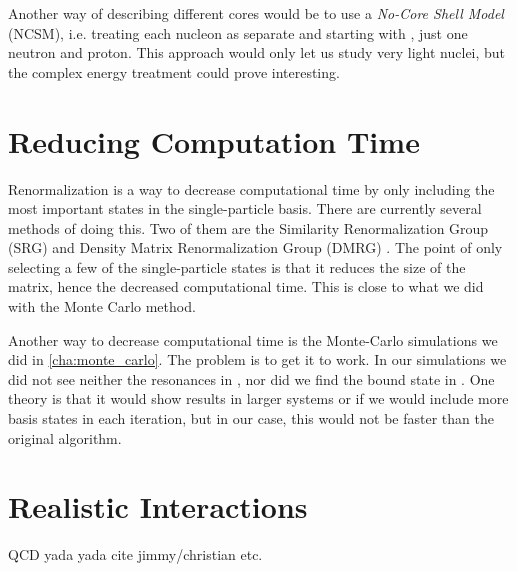 \documentclass[../main/report.tex]{subfiles}
\begin{document}
Another way of describing different cores would be to use a \emph{No-Core Shell Model} (NCSM), i.e. treating each nucleon as separate and starting with , just one neutron and proton. This approach would only let us study very light nuclei, but the complex energy treatment could prove interesting.

\section{Reducing Computation Time}

Renormalization is a way to decrease computational time by only including the most important states in the single-particle basis.
There are currently several methods of doing this. Two of them are the Similarity Renormalization Group (SRG) and Density Matrix Renormalization Group (DMRG) \cite{DMRG}.
The point of only selecting a few of the single-particle states is that it reduces the size of the matrix, hence the decreased computational time.
This is close to what we did with the Monte Carlo method.

Another way to decrease computational time is the Monte-Carlo simulations we did in \cref{cha:monte_carlo}.
The problem is to get it to work.
In our simulations we did not see neither the resonances in , nor did we find the bound state in .
One theory is that it would show results in larger systems or if we would include more basis states in each iteration, but in our case, this would not be faster than the original algorithm.

\section{Realistic Interactions}

QCD yada yada cite jimmy/christian etc.
\end{document}
